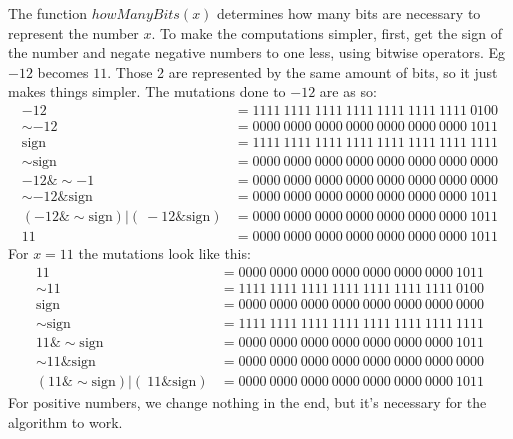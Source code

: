 \documentclass[11pt]{report}
\begin{document}
The function $howManyBits(x)$ determines how many bits are necessary to represent the number $x$. To make the computations simpler, first, get the sign of the number and negate negative numbers to one less, using bitwise operators. Eg $-12$ becomes $11$. Those 2 are represented by the same amount of bits, so it just makes things simpler. The mutations done to $-12$ are as so:
\begin{align*}
    -12 &= 1111\ 1111\ 1111\ 1111\ 1111\ 1111\ 1111\ 0100\\
    \sim-12 &= 0000\ 0000\ 0000\ 0000\ 0000\ 0000\ 0000\ 1011\\
    \text{sign}  &= 1111\ 1111\ 1111\ 1111\ 1111\ 1111\ 1111\ 1111\\
    \sim\text{sign} &= 0000\ 0000\ 0000\ 0000\ 0000\ 0000\ 0000\ 0000\\
    -12 \& \sim-1 &= 0000\ 0000\ 0000\ 0000\ 0000\ 0000\ 0000\ 0000\\
    \sim-12 \& \text{sign} &= 0000\ 0000\ 0000\ 0000\ 0000\ 0000\ 0000\ 1011\\
    (-12 \& \sim\text{sign}) | (~-12 \& \text{sign}) &= 0000\ 0000\ 0000\ 0000\ 0000\ 0000\ 0000\ 1011\\
    11  &= 0000\ 0000\ 0000\ 0000\ 0000\ 0000\ 0000\ 1011
\end{align*}
For $x=11$ the mutations look like this:
\begin{align*}
    11 &= 0000\ 0000\ 0000\ 0000\ 0000\ 0000\ 0000\ 1011\\
    \sim11 &= 1111\ 1111\ 1111\ 1111\ 1111\ 1111\ 1111\ 0100\\
    \text{sign} &= 0000\ 0000\ 0000\ 0000\ 0000\ 0000\ 0000\ 0000\\
    \sim\text{sign} &= 1111\ 1111\ 1111\ 1111\ 1111\ 1111\ 1111\ 1111\\
    11 \& \sim\text{sign} &= 0000\ 0000\ 0000\ 0000\ 0000\ 0000\ 0000\ 1011\\
    \sim11 \& \text{sign} &= 0000\ 0000\ 0000\ 0000\ 0000\ 0000\ 0000\ 0000\\
    (11 \& \sim\text{sign}) | (~11 \& \text{sign}) &= 0000\ 0000\ 0000\ 0000\ 0000\ 0000\ 0000\ 1011
\end{align*}
For positive numbers, we change nothing in the end, but it's necessary for the algorithm to work.\\[1ex]
\end{document}
